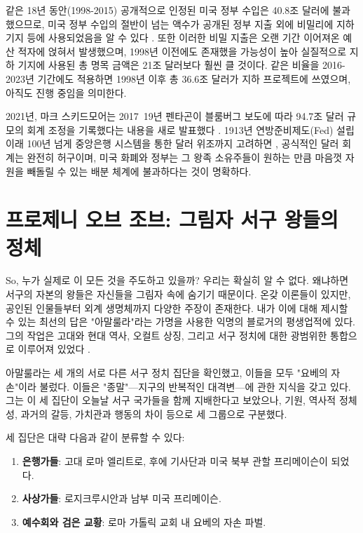 \documentclass[10pt,twocolumn,letterpaper]{article}
\begin{document}
같은 18년 동안(1998-2015) 공개적으로 인정된 미국 정부 수입은 40.8조 달러에 불과했으므로, 미국 정부 수입의 절반이 넘는 액수가 공개된 정부 지출 외에 비밀리에 지하 기지 등에 사용되었음을 알 수 있다 \cite{15}. 또한 이러한 비밀 지출은 오랜 기간 이어져온 예산 적자에 얹혀서 발생했으며, 1998년 이전에도 존재했을 가능성이 높아 실질적으로 지하 기지에 사용된 총 명목 금액은 21조 달러보다 훨씬 클 것이다. 같은 비율을 2016-2023년 기간에도 적용하면 1998년 이후 총 36.6조 달러가 지하 프로젝트에 쓰였으며, 아직도 진행 중임을 의미한다.

2021년, 마크 스키드모어는 2017~19년 펜타곤이 블룸버그 보도에 따라 94.7조 달러 규모의 회계 조정을 기록했다는 내용을 새로 발표했다 \cite{17,18}. 1913년 연방준비제도(Fed) 설립 이래 100년 넘게 중앙은행 시스템을 통한 달러 위조까지 고려하면 \cite{37}, 공식적인 달러 회계는 완전히 허구이며, 미국 화폐와 정부는 그 왕족 소유주들이 원하는 만큼 마음껏 자원을 빼돌릴 수 있는 배분 체계에 불과하다는 것이 명확하다.

\section{프로제니 오브 조브: 그림자 서구 왕들의 정체}
So, 누가 실제로 이 모든 것을 주도하고 있을까? 우리는 확실히 알 수 없다. 왜냐하면 서구의 자본의 왕들은 자신들을 그림자 속에 숨기기 때문이다. 온갖 이론들이 있지만, 공인된 인물들부터 외계 생명체까지 다양한 주장이 존재한다. 내가 이에 대해 제시할 수 있는 최선의 답은 "아말룰라"라는 가명을 사용한 익명의 블로거의 평생업적에 있다. 그의 작업은 고대와 현대 역사, 오컬트 상징, 그리고 서구 정치에 대한 광범위한 통합으로 이루어져 있었다 \cite{33,34}.

아말룰라는 세 개의 서로 다른 서구 정치 집단을 확인했고, 이들을 모두 "요베의 자손"이라 불렀다. 이들은 "종말"—지구의 반복적인 대격변—에 관한 지식을 갖고 있다. 그는 이 세 집단이 오늘날 서구 국가들을 함께 지배한다고 보았으나, 기원, 역사적 정체성, 과거의 갈등, 가치관과 행동의 차이 등으로 세 그룹으로 구분했다.

세 집단은 대략 다음과 같이 분류할 수 있다:

\begin{flushleft}
\begin{enumerate}
    \item \textbf{은행가들}: 고대 로마 엘리트로, 후에 기사단과 미국 북부 관할 프리메이슨이 되었다.
    \item \textbf{사상가들}: 로지크루시안과 남부 미국 프리메이슨.
    \item \textbf{예수회와 검은 교황}: 로마 가톨릭 교회 내 요베의 자손 파벌.
\end{enumerate}
\end{flushleft}
\end{document}
